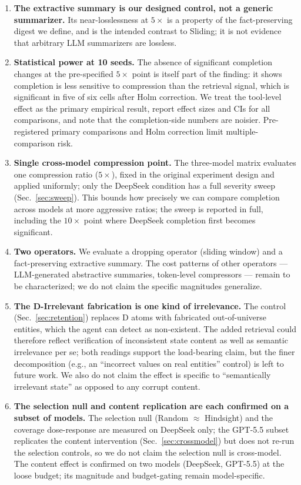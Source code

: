 \documentclass[11pt]{article}
\begin{document}
\begin{enumerate}
\item \textbf{The extractive summary is our designed control, not a generic summarizer.} Its
  near-losslessness at $5\times$ is a property of the fact-preserving digest we define, and is
  the intended contrast to Sliding; it is not evidence that arbitrary LLM summarizers
  are lossless.

\item \textbf{Statistical power at 10 seeds.} The absence of significant completion changes at
  the pre-specified $5\times$ point is itself part of the finding: it shows completion is less
  sensitive to compression than the retrieval signal, which is significant in five of
  six cells after Holm correction. We treat the tool-level effect as the primary
  empirical result, report effect sizes and CIs for all comparisons, and note that the
  completion-side numbers are noisier. Pre-registered primary comparisons and Holm
  correction limit multiple-comparison risk.

\item \textbf{Single cross-model compression point.} The three-model matrix evaluates one
  compression ratio ($5\times$), fixed in the original experiment design and applied uniformly;
  only the DeepSeek condition has a full severity sweep (Sec.~\ref{sec:sweep}). This bounds how precisely
  we can compare completion across models at more aggressive ratios; the sweep is
  reported in full, including the $10\times$ point where DeepSeek completion first becomes
  significant.

\item \textbf{Two operators.} We evaluate a dropping operator (sliding window) and a
  fact-preserving extractive summary. The cost patterns of other operators ---
  LLM-generated abstractive summaries, token-level compressors --- remain to be
  characterized; we do not claim the specific magnitudes generalize.

\item \textbf{The D-Irrelevant fabrication is one kind of irrelevance.} The control
  (Sec.~\ref{sec:retention}) replaces D atoms with fabricated out-of-universe entities, which the agent can detect
  as non-existent. The added retrieval could therefore reflect verification of
  inconsistent state content as well as semantic irrelevance per se; both readings
  support the load-bearing claim, but the finer decomposition (e.g., an ``incorrect
  values on real entities'' control) is left to future work. We also do not claim the
  effect is specific to ``semantically irrelevant state'' as opposed to any corrupt
  content.

\item \textbf{The selection null and content replication are each confirmed on a subset of
  models.} The selection null (Random $\approx$ Hindsight) and the coverage dose-response are
  measured on DeepSeek only; the GPT-5.5 subset replicates the content intervention
  (Sec.~\ref{sec:crossmodel}) but does not re-run the selection controls, so we do not claim the selection
  null is cross-model. The content effect is confirmed on two models (DeepSeek, GPT-5.5)
  at the loose budget; its magnitude and budget-gating remain model-specific.
\end{enumerate}
\end{document}
